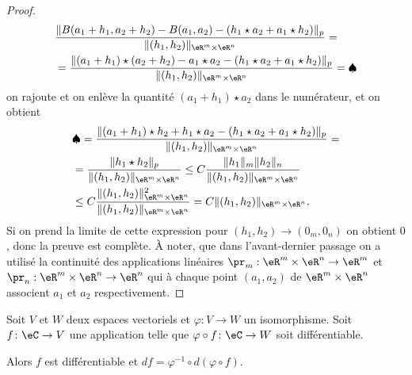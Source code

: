 \begin{proof}
	\begin{equation}
		\begin{aligned}
			 & \frac{\|B(a_1+h_1,a_2+h_2)-B(a_1,a_2)-(h_1\star a_2 + a_1\star h_2)\|_p}{\|(h_1,h_2)\|_{\eR^m\times\eR^n}} =                   \\
			 & = \frac{\|(a_1+h_1)\star(a_2+h_2)-a_1\star a_2-(h_1\star a_2 + a_1\star h_2)\|_p}{\|(h_1,h_2)\|_{\eR^m\times\eR^n}}=\spadesuit
		\end{aligned}
	\end{equation}
	on rajoute et on enlève la quantité \( (a_1+h_1)\star a_2\) dans le numérateur, et on obtient
	\begin{equation}
		\begin{aligned}
			 & \spadesuit= \frac{\|(a_1+h_1)\star h_2+h_1\star a_2-(h_1\star a_2 + a_1\star h_2)\|_p}{\|(h_1,h_2)\|_{\eR^m\times\eR^n}}=          \\
			 & = \frac{\|h_1\star h_2\|_p}{\|(h_1,h_2)\|_{\eR^m\times\eR^n}}\leq C\frac{\|h_1\|_m\|h_2\|_n}{\|(h_1,h_2)\|_{\eR^m\times\eR^n}}     \\
			 & \leq C\frac{\|(h_1,h_2)\|^2_{\eR^m\times\eR^n}}{\|(h_1,h_2)\|_{\eR^m\times\eR^n}}= C\|(h_1,h_2)\|_{\eR^m\times\eR^n}.
		\end{aligned}
	\end{equation}
	Si on prend la limite de cette expression pour \( (h_1,h_2)\to (0_m,0_n)\) on obtient \( 0\), donc la preuve est complète. À noter, que dans l'avant-dernier passage on a utilisé la continuité des applications linéaires \( \pr_m:\eR^m\times\eR^n\to \eR^m\) et \( \pr_n: \eR^m\times\eR^n\to \eR^n\) qui à chaque point \( (a_1,a_2)\) de \( \eR^m\times\eR^n\) associent \( a_1\) et \( a_2\) respectivement.
\end{proof}

\begin{proposition}     \label{PropEKLTooSvZjdW}
	Soit \( V\) et \( W\) deux espaces vectoriels et \( \varphi\colon V\to W\) un isomorphisme. Soit \( f\colon \eC\to V\) une application telle que \(\varphi\circ f\colon \eC\to W\) soit différentiable.

	Alors \( f\) est différentiable et \( df=\varphi^{-1}\circ d(\varphi\circ f)\).
\end{proposition}

